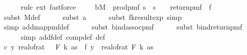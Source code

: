 \begin{isabellebody}
\ \ \ \ \isamarkupfalse%
\ {\isacharparenleft}{\kern0pt}rule\ ext{\isacharcomma}{\kern0pt}\ fastforce{\isacharparenright}{\kern0pt}\ \isanewline
\isanewline
\ \ \isamarkupfalse%
\ b{\isacharcolon}{\kern0pt}{\isachardoublequoteopen}M\ {\isacharequal}{\kern0pt}\ prod{\isacharunderscore}{\kern0pt}pmf\ {\isacharparenleft}{\kern0pt}{\isacharbraceleft}{\kern0pt}{}{\isachardot}{\kern0pt}{\isachardot}{\kern0pt}{\isacharless}{\kern0pt}s\ {\isasymtimes}\ {\isacharbraceleft}{\kern0pt}{}{\isachardot}{\kern0pt}{\isachardot}{\kern0pt}{\isacharless}{\kern0pt}s\ {\isacharparenleft}{\kern0pt}{\isasymlambda}{\isacharunderscore}{\kern0pt}{\isachardot}{\kern0pt}\ {\isasymOmega}{\isacharparenright}{\kern0pt}\ {\isasymbind}\ return{\isacharunderscore}{\kern0pt}pmf\ {\isasymcirc}\ f{\isachardoublequoteclose}\isanewline
\ \ \ \ \isamarkupfalse%
\ {\isacharparenleft}{\kern0pt}subst\ M{\isacharunderscore}{\kern0pt}def{\isacharparenright}{\kern0pt}\isanewline
\ \ \ \ \isamarkupfalse%
\ {\isacharparenleft}{\kern0pt}subst\ a{\isacharparenright}{\kern0pt}\isanewline
\ \ \ \ \isamarkupfalse%
\ {\isacharparenleft}{\kern0pt}subst\ fk{\isacharunderscore}{\kern0pt}result{\isacharunderscore}{\kern0pt}exp{\isacharcomma}{\kern0pt}\ simp{\isacharparenright}{\kern0pt}\isanewline
\ \ \ \ \isamarkupfalse%
\ {\isacharparenleft}{\kern0pt}simp\ add{\isacharcolon}{\kern0pt}map{\isacharunderscore}{\kern0pt}pmf{\isacharunderscore}{\kern0pt}def{\isacharparenright}{\kern0pt}\isanewline
\ \ \ \ \isamarkupfalse%
\ {\isacharparenleft}{\kern0pt}subst\ bind{\isacharunderscore}{\kern0pt}assoc{\isacharunderscore}{\kern0pt}pmf{\isacharparenright}{\kern0pt}\isanewline
\ \ \ \ \isamarkupfalse%
\ {\isacharparenleft}{\kern0pt}subst\ bind{\isacharunderscore}{\kern0pt}return{\isacharunderscore}{\kern0pt}pmf{\isacharparenright}{\kern0pt}\isanewline
\ \ \ \ \isamarkupfalse%
\ {\isacharparenleft}{\kern0pt}simp\ add{\isacharcolon}{\kern0pt}f{\isacharunderscore}{\kern0pt}def\ comp{\isacharunderscore}{\kern0pt}def\ {\isasymOmega}{\isacharunderscore}{\kern0pt}def{\isacharparenright}{\kern0pt}\isanewline
\isanewline
\ \ \isamarkupfalse%
\ c{\isacharcolon}{\kern0pt}\ {\isachardoublequoteopen}{\isacharbraceleft}{\kern0pt}y{\isachardot}{\kern0pt}\ real{\isacharunderscore}{\kern0pt}of{\isacharunderscore}{\kern0pt}rat\ {\isacharparenleft}{\kern0pt}{\isasymdelta}\ {\isacharasterisk}{\kern0pt}\ F\ k\ as{\isacharparenright}{\kern0pt}\ {\isasymge}\ {\isasymbar}f{\isacharprime}{\kern0pt}\ y\ {\isacharminus}{\kern0pt}\ real{\isacharunderscore}{\kern0pt}of{\isacharunderscore}{\kern0pt}rat\ {\isacharparenleft}{\kern0pt}F\ k\ as{\isacharparenright}{\kern0pt}{\isasymbar}{\isacharbraceright}{\kern0pt}\ {\isacharequal}{\kern0pt}\ \isanewline

\end{isabellebody}
